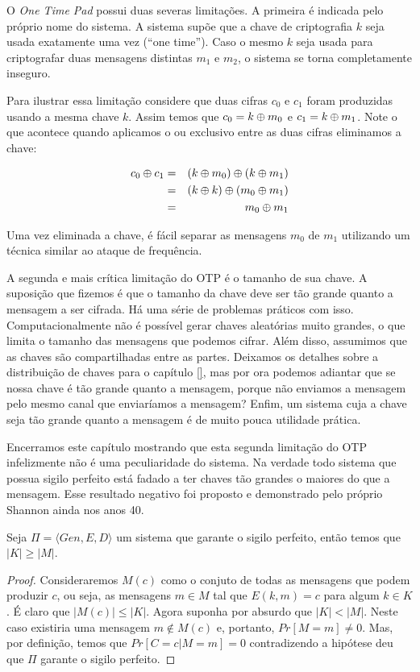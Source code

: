 O {\em One Time Pad} possui duas severas limitações.
A primeira é indicada pelo próprio nome do sistema.
A sistema supõe que a chave de criptografia $k$ seja usada exatamente uma vez (``one time'').
Caso o mesmo $k$ seja usada para criptografar duas mensagens distintas $m_1$ e $m_2$, o sistema se torna completamente inseguro.

Para ilustrar essa limitação considere que duas cifras $c_0$ e $c_1$ foram produzidas usando a mesma chave $k$.
Assim temos que $c_0 = k \oplus m_0$ e $c_1 = k \oplus m_1$.
Note o que acontece quando aplicamos o ou exclusivo entre as duas cifras eliminamos a chave:


\begin{eqnarray*}
  c_0 \oplus c_1 & = & (k \oplus m_0) \oplus (k \oplus m_1)\\
              & = & (k \oplus k) \oplus (m_0 \oplus m_1)\\
              & = & m_0 \oplus m_1
\end{eqnarray*}

Uma vez eliminada a chave, é fácil separar as mensagens $m_0$ de $m_1$ utilizando um técnica similar ao ataque de frequência.

A segunda e mais crítica limitação do OTP é o tamanho de sua chave.
A suposição que fizemos é que o tamanho da chave deve ser tão grande quanto a mensagem a ser cifrada.
Há uma série de problemas práticos com isso.
Computacionalmente não é possível gerar chaves aleatórias muito grandes, o que limita o tamanho das mensagens que podemos cifrar.
Além disso, assumimos que as chaves são compartilhadas entre as partes.
Deixamos os detalhes sobre a distribuição de chaves para o capítulo \ref{}, mas por ora podemos adiantar que se nossa chave é tão grande quanto a mensagem, porque não enviamos a mensagem pelo mesmo canal que enviaríamos a mensagem?
Enfim, um sistema cuja a chave seja tão grande quanto a mensagem é de muito pouca utilidade prática.

Encerramos este capítulo mostrando que esta segunda limitação do OTP infelizmente não é uma peculiaridade do sistema.
Na verdade todo sistema que possua sigilo perfeito está fadado a ter chaves tão grandes o maiores do que a mensagem.
Esse resultado negativo foi proposto e demonstrado pelo próprio Shannon ainda nos anos 40.


\begin{theorem}
Seja $\Pi = \langle Gen, E, D \rangle$ um sistema que garante o sigilo perfeito, então temos que $|K| \geq |M|$.  
\end{theorem}
\begin{proof}
  Consideraremos $M(c)$ como o conjuto de todas as mensagens que podem produzir $c$, ou seja, as mensagens $m \in M$ tal que $E(k, m) = c$ para algum $k \in K$.
  É claro que $|M(c)| \leq |K|$.
  Agora suponha por absurdo que $|K| < |M|$.
  Neste caso existiria uma mensagem $m \notin M(c)$ e, portanto, $Pr[M = m] \neq 0$.
  Mas, por definição, temos que $Pr[C = c | M = m] = 0$ contradizendo a hipótese deu que $\Pi$ garante o sigilo perfeito. 
\end{proof}

